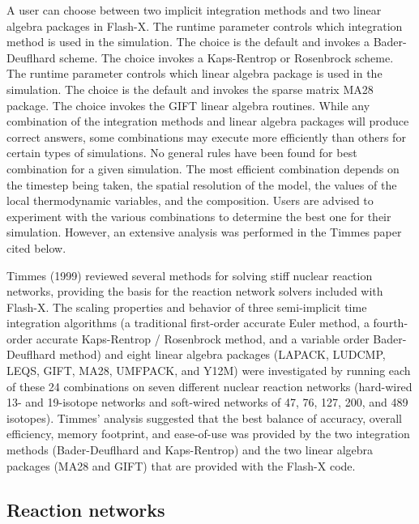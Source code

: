 A user can choose between two implicit integration methods and two
linear algebra packages in Flash-X. The runtime parameter
controls which integration method is used in the simulation. The
choice  is the default and invokes a
Bader-Deuflhard scheme.  The choice  invokes a
Kaps-Rentrop or Rosenbrock scheme.
The runtime parameter  controls which
linear algebra package is used in the simulation.  The choice
 is the default and invokes the sparse matrix MA28 package.
The choice  invokes the GIFT linear algebra routines.
While any combination of the integration methods and linear algebra
packages will produce correct answers, some combinations may execute
more efficiently than others for certain types of
simulations.  No general rules have been found for best combination
for a given simulation. The most efficient combination depends on the
timestep being taken, the spatial resolution of the model, the values
of the local thermodynamic variables, and the composition. Users are
advised to experiment with the various combinations to determine the
best one for their simulation.  However, an extensive analysis was performed in
the Timmes paper cited below.

Timmes (1999) reviewed several methods for solving stiff nuclear
reaction networks, providing the basis for the reaction network solvers
included with Flash-X.  The scaling properties and behavior of three
semi-implicit time integration algorithms (a traditional first-order
accurate Euler method, a fourth-order accurate Kaps-Rentrop / Rosenbrock method,
and a variable order Bader-Deuflhard method) and eight linear algebra
packages (LAPACK, LUDCMP, LEQS, GIFT, MA28, UMFPACK, and Y12M) were
investigated by running each of these 24 combinations on seven
different nuclear reaction networks (hard-wired 13- and 19-isotope
networks and soft-wired networks of 47, 76, 127, 200, and 489
isotopes).  Timmes' analysis suggested that the best balance of
accuracy, overall efficiency, memory footprint, and ease-of-use was
provided by the two integration methods (Bader-Deuflhard and Kaps-Rentrop)
and the two linear algebra packages (MA28 and GIFT) that are provided
with the Flash-X code.


\subsection{Reaction networks}


